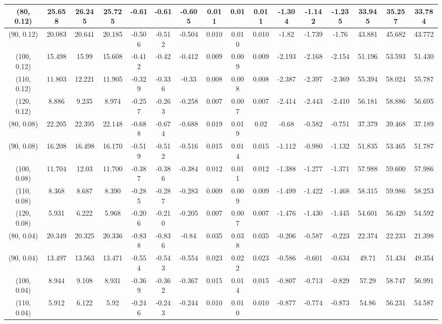 \documentclass[preprint,12pt,1p]{elsarticle}
\begin{document}
\begin{table}[!h]
\begin{center}
{\begin{tabular}{| c | c | c | c | c | c | c| c| c| c| c| c| c| c| c| c|}
(80, 0.12)&  25.658 & 26.245 & 25.725 & -0.61 & -0.61 & -0.605 & 0.011 & 0.01 & 0.011 & -1.304 & -1.142 & -1.235 & 33.945 & 35.257 & 33.784 \\ \hline    
(90, 0.12)&  20.083 & 20.641 & 20.185 & -0.506 & -0.512 & -0.504 & 0.010 & 0.010 & 0.010 & -1.82 & -1.739 & -1.76 & 43.881 & 45.682 & 43.772 \\ \hline    
(100, 0.12)&  15.498 & 15.99 & 15.608 & -0.412 & -0.42 & -0.412 & 0.009 & 0.009 & 0.009 & -2.193 & -2.168 & -2.154 & 51.196 & 53.593 & 51.430  \\ \hline    
(110, 0.12)&  11.803 & 12.221 & 11.905 & -0.329 & -0.336 & -0.33 & 0.008 & 0.008 & 0.008 & -2.387 & -2.397 & -2.369 & 55.394 & 58.024 & 55.787 \\ \hline    
(120, 0.12)&  8.886 & 9.235 & 8.974 & -0.257 & -0.263 & -0.258 & 0.007 & 0.007 & 0.007 & -2.414 & -2.443 & -2.410 & 56.181 & 58.886 & 56.695 \\ \hline    
(80, 0.08)&  22.205 & 22.395 & 22.148 & -0.688 & -0.674 & -0.688 & 0.019 & 0.019 & 0.02 & -0.68 & -0.582 & -0.751 & 37.379 & 39.468 & 37.189 \\ \hline    
(90, 0.08)&  16.208 & 16.498 & 16.170 & -0.519 & -0.512 & -0.516 & 0.015 & 0.014 & 0.015 & -1.112 & -0.980 & -1.132 & 51.835 & 53.465 & 51.787 \\ \hline    
(100, 0.08)&  11.704 & 12.03 & 11.700 & -0.387 & -0.386 & -0.384 & 0.012 & 0.011 & 0.012 & -1.388 & -1.277 & -1.371 & 57.988 & 59.600 & 57.986 \\ \hline    
(110, 0.08)&  8.368 & 8.687 & 8.390 & -0.285 & -0.287 & -0.283 & 0.009 & 0.009 & 0.009 & -1.499 & -1.422 & -1.468 & 58.315 & 59.986 & 58.253\\ \hline    
(120, 0.08)&  5.931 & 6.222 & 5.968 & -0.206 & -0.210 & -0.205 & 0.007 & 0.007 & 0.007 & -1.476 & -1.430 & -1.445 & 54.601 & 56.420 & 54.592 \\ \hline
(80, 0.04)&  20.349 & 20.325 & 20.336 & -0.838 & -0.836 & -0.84 & 0.035 & 0.038 & 0.035 & -0.206 & -0.587 & -0.223 & 22.374 & 22.233 & 21.398 \\ \hline    
(90, 0.04)&  13.497 & 13.563 & 13.471 & -0.554 & -0.543 & -0.554 & 0.023 & 0.022 & 0.023 & -0.586 & -0.601 & -0.634 & 49.71 & 51.434 & 49.354 \\ \hline    
(100, 0.04)&  8.944 & 9.108 & 8.931 & -0.369 & -0.362 & -0.367 & 0.015 & 0.014 & 0.015 & -0.807 & -0.713 & -0.829 & 57.29 & 58.747 & 56.991 \\ \hline    
(110, 0.04)& 5.912 & 6.122 & 5.92 & -0.246 & -0.243 & -0.244 & 0.010 & 0.010 & 0.010 & -0.877 & -0.774 & -0.873 & 54.86 & 56.231 & 54.587 \\ \hline    

\end{tabular}}
\end{center}
\end{table}
\end{document}
